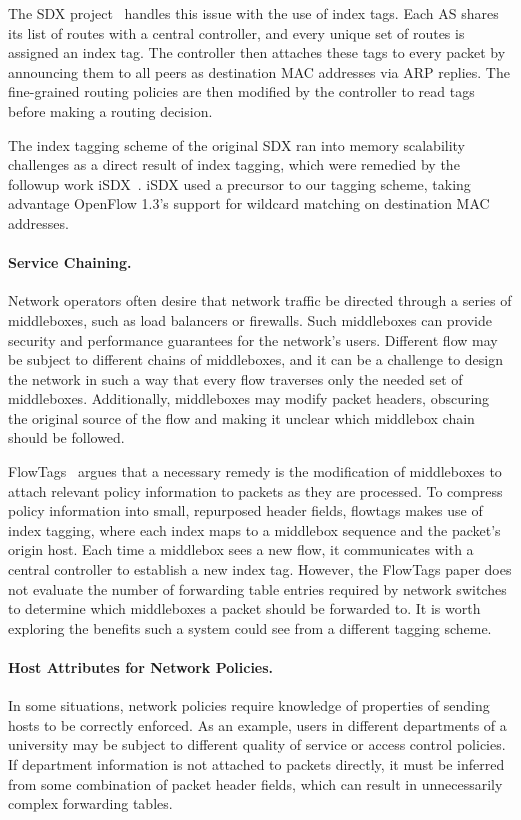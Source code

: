 The SDX project~\cite{sdx} handles this issue with the use of index tags. Each AS shares its list of routes with a central controller, and every unique set of routes is assigned an index tag. The controller then attaches these tags to every packet by announcing them to all peers as destination MAC addresses via ARP replies. The fine-grained routing policies are then modified by the controller to read tags before making a routing decision. 

The index tagging scheme of the original SDX ran into memory scalability challenges as a direct result of index tagging, which were remedied by the followup work iSDX~\cite{isdx}. iSDX used a precursor to our tagging scheme, taking advantage OpenFlow 1.3's support for wildcard matching on destination MAC addresses. 

\paragraph{Service Chaining.}
Network operators often desire that network traffic be directed through a series of middleboxes, such as load balancers or firewalls. Such middleboxes can provide security and performance guarantees for the network's users.
 Different flow may be subject to different chains of middleboxes, and it can be a challenge to design the network in such a way that every flow traverses only the needed set of middleboxes. Additionally, middleboxes may modify packet headers, obscuring the original source of the flow and making it unclear which middlebox chain should be followed. 
 
FlowTags~\cite{flowtags} argues that a necessary remedy is the modification of middleboxes to attach relevant policy information to packets as they are processed. To compress policy information into small, repurposed header fields, flowtags makes use of index tagging, where each index maps to a middlebox sequence and the packet's origin host. Each time a middlebox sees a new flow, it communicates with a central controller to establish a new index tag. 
However, the FlowTags paper does not evaluate the number of forwarding table entries required by network switches to determine which middleboxes a packet should be forwarded to. It is worth exploring the benefits such a system could see from a different tagging scheme. 
 

\paragraph{Host Attributes for Network Policies.}
In some situations, network policies require knowledge of properties of sending hosts to be correctly enforced. As an example, users in different departments of a university may be subject to different quality of service or access control policies. If department information is not attached to packets directly, it must be inferred from some combination of packet header fields, which can result in unnecessarily complex forwarding tables. 

